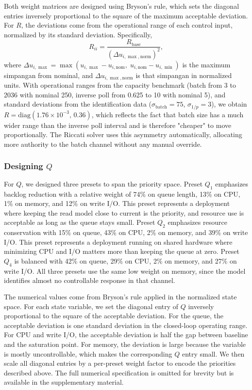\documentclass[10pt,a4paper]{article}
\begin{document}
Both weight matrices are designed using Bryson's rule, which sets the diagonal entries inversely proportional to the square of the maximum acceptable deviation. For $R$, the deviations come from the operational range of each control input, normalized by its standard deviation. Specifically,
\begin{equation}
R_{ii} = \frac{R_{\text{base}}}{(\Delta u_{i,\max,\text{norm}})^2},
\end{equation}
where $\Delta u_{i,\max} = \max(u_{i,\max} - u_{i,\text{nom}},\; u_{i,\text{nom}} - u_{i,\min})$ is the maximum simpangan from nominal, and $\Delta u_{i,\max,\text{norm}}$ is that simpangan in normalized units. With operational ranges from the capacity benchmark (batch from 3 to 2036 with nominal 250, inverse poll from 0.625 to 10 with nominal 5), and standard deviations from the identification data ($\sigma_{\text{batch}} = 75$, $\sigma_{1/p} = 3$), we obtain $R = \mathrm{diag}(1.76\times 10^{-3},\, 0.36)$, which reflects the fact that batch size has a much wider range than the inverse poll interval and is therefore "cheaper" to move proportionally. The Riccati solver uses this asymmetry automatically, allocating more authority to the batch channel without any manual override.

\subsubsection{Designing $Q$}

For $Q$, we designed three presets to span the priority space. Preset $Q_1$ emphasizes backlog reduction with a relative weight of 74\% on queue length, 13\% on CPU, 1\% on memory, and 12\% on write I/O. This preset represents a deployment where keeping the read model close to current is the priority, and resource use is acceptable as long as the queue stays small. Preset $Q_2$ emphasizes resource conservation with 15\% on queue, 43\% on CPU, 2\% on memory, and 39\% on write I/O. This preset represents a deployment running on shared hardware where minimizing CPU and I/O matters more than keeping the queue at zero. Preset $Q_4$ is balanced with 42\% on queue, 29\% on CPU, 2\% on memory, and 27\% on write I/O. All three presets use the same low weight on memory, since the model identifies almost no controllable response in that channel.

The numerical values come from Bryson's rule applied in the normalized state space. For each state variable, we set the diagonal entry of $Q$ inversely proportional to the square of the acceptable deviation. For the queue, the acceptable deviation is one standard deviation in the closed-loop operating range. For CPU and write I/O, the acceptable deviation is half the gap between baseline and the saturation point. For memory, the deviation is large because the variable is mostly uncontrollable, which makes the corresponding $Q$ entry small. We then scale all diagonal entries by a per-preset weight factor to encode the priorities described above. The full numerical specification is omitted for brevity but is available in the supplementary material.
\end{document}
